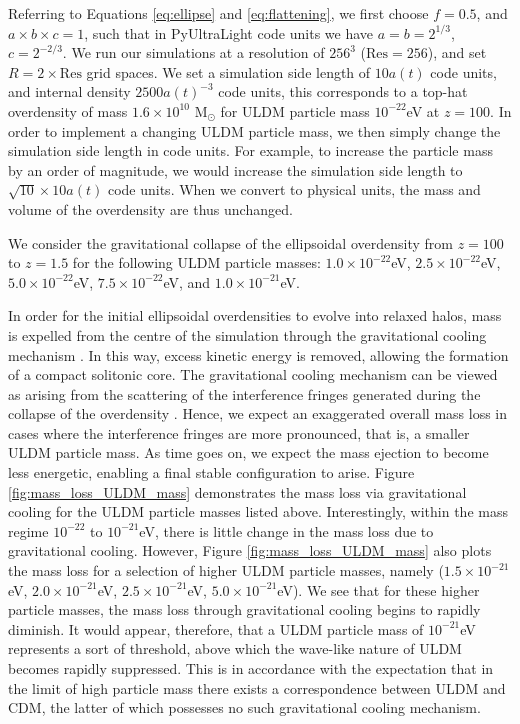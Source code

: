\documentclass[a4paper,11pt]{article}
\begin{document}
Referring to Equations \ref{eq:ellipse} and \ref{eq:flattening}, we first choose $f=0.5$, and $a\times b\times c = 1$, such that in {\sc PyUltraLight} code units we have $a = b = 2^{1/3}$, $c = 2^{-2/3}$. We run our simulations at a resolution of $256^3$ ($\mathrm{Res} = 256$), and set $R = 2 \times \mathrm{Res}$ grid spaces. We set a simulation side length of $10 a(t)$ code units, and internal density $2500 a(t)^{-3}$ code units, this corresponds to a top-hat overdensity of mass $1.6 \times 10^{10}$ M$_\odot$ for ULDM particle mass $10^{-22}$eV at $z=100$. In order to implement a changing ULDM particle mass, we then simply change the simulation side length in code units. For example, to increase the particle mass by an order of magnitude, we would increase the simulation side length to $\sqrt{10} \times 10a(t)$ code units. When we convert to physical units, the mass and volume of the overdensity are thus unchanged. 

We consider the gravitational collapse of the ellipsoidal overdensity from $z=100$ to $z=1.5$ for the following ULDM particle masses: $1.0\times 10^{-22}$eV, $2.5\times 10^{-22}$eV, $5.0\times 10^{-22}$eV, $7.5\times 10^{-22}$eV, and $1.0 \times 10^{-21}$eV.

In order for the initial ellipsoidal overdensities to evolve into relaxed halos, mass is expelled from the centre of the simulation through the gravitational cooling mechanism \cite{Seidel:1993zk, Guzman:2006yc}. In this way, excess kinetic energy is removed, allowing the formation of a compact solitonic core. The gravitational cooling mechanism can be viewed as arising from the scattering of the interference fringes generated during the collapse of the overdensity \cite{Arvanitaki:2019rax}. Hence, we expect an exaggerated overall mass loss in cases where the interference fringes are more pronounced, that is, a smaller ULDM particle mass. As time goes on, we expect the mass ejection to become less energetic, enabling a final stable configuration to arise. Figure \ref{fig:mass_loss_ULDM_mass} demonstrates the mass loss via gravitational cooling for the ULDM particle masses listed above. Interestingly, within the mass regime $10^{-22}$ to $10^{-21}$eV, there is little change in the mass loss due to gravitational cooling. However, Figure \ref{fig:mass_loss_ULDM_mass} also plots the mass loss for a selection of higher ULDM particle masses, namely ($1.5\times 10^{-21}$eV, $2.0\times 10^{-21}$eV, $2.5\times 10^{-21}$eV, $5.0\times 10^{-21}$eV). We see that for these higher particle masses, the mass loss through gravitational cooling begins to rapidly diminish. It would appear, therefore, that a ULDM particle mass of $10^{-21}$eV represents a sort of threshold, above which the wave-like nature of ULDM becomes rapidly suppressed. This is in accordance with the expectation that in the limit of high particle mass there exists a correspondence between ULDM and CDM, the latter of which possesses no such gravitational cooling mechanism.
\end{document}
